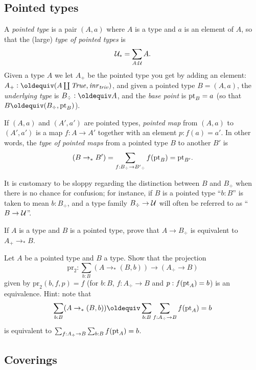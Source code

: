 \subsection{Pointed types}
\label{sec:poitedtypes}
\begin{definition}\label{def:pointedtypes}
  A \emph{pointed type} is a pair $(A,a)$ where $A$ is a type and $a$ is an element of $A$, so that the (large) \emph{type of pointed types} is
$$\mathcal{U}_*=\sum_{A:\mathcal{U}}A.$$
Given a type $A$ we let $A_+$ be the pointed type you get by adding an element: $A_+\defequi(A\coprod\true,\inr{\triv})$, and given a pointed type $B=(A,a)$, the \emph{underlying type} is $B_\div\defequi A$, and the \emph{base point} is ${\mathord{\mathrm{pt}}}_B=a$ (so that $B\oldequiv (B_\div,\pt_B)$).  

If $(A,a)$ and $(A',a')$ are pointed types,  \emph{pointed map} from  $(A,a)$ to $(A',a')$ is a map $f:A\to A'$ together with an element $p:f(a)=a'$.  In other words, the \emph{type of pointed maps} from a pointed type $B$ to another $B'$ is
$$(B\to_*B')=\sum_{f:B_\div\to B'{}_\div}f({\mathord{\mathrm{pt}}}_B)={\mathord{\mathrm{pt}}}_{B'}.$$
\end{definition}
\begin{remark}
  It is customary to be sloppy regarding the distinction between $B$ and $B_\div$  when there is no chance for confusion; for instance, if $B$ is a pointed type ``$b:B$'' is taken to mean $b:B_\div$, and a type family $B_\div\to\mathcal{U}$ will often be referred to as ``$B\to\mathcal{U}$''.
\end{remark}

\begin{xca}\label{xca:plusforgetadjoint}
  If $A$ is a type and $B$ is a pointed type, prove that $A\to B_\div$ is equivalent to $A_+\to_*B$.
\end{xca}
\begin{xca}\label{xca:freemaps}
  Let $A$ be a pointed type and $B$ a type.  Show that the projection  
$$\mathrm{pr}_2:\sum_{b:B}(A\to_*(B,b))\to (A_\div\to B)$$
given by $\mathrm{pr}_2(b,f,p)=f$ (for $b:B$, $f:A_\div\to B$ and $p:f({\mathord{\mathrm{pt}}}_A)=b$) is an equivalence.
Hint: note that 
$$\sum_{b:B}(A\to_*(B,b))\oldequiv \sum_{b:B}\sum_{f:A_\div\to B}f(\pt_A)=b$$ is equivalent to $\sum_{f:A_\div\to B}\sum_{b:B}f({\mathord{\mathrm{pt}}}_A)=b$.
\end{xca}



\subsection{Coverings}
\label{sec:covering}

